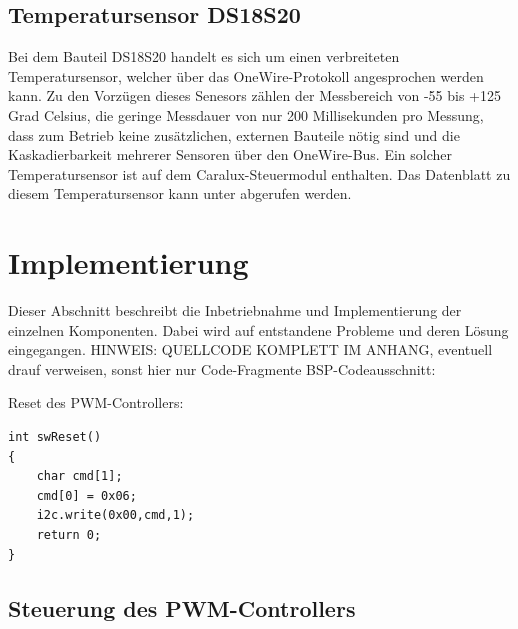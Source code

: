 \documentclass[a4paper,12pt]{scrartcl}
\begin{document}
\subsection{Temperatursensor DS18S20}
Bei dem Bauteil DS18S20 handelt es sich um einen verbreiteten Temperatursensor,
welcher über das OneWire-Protokoll angesprochen werden kann. Zu den Vorzügen
dieses Senesors zählen der Messbereich von -55 bis +125 Grad Celsius, die
geringe Messdauer von nur 200 Millisekunden pro Messung, dass zum Betrieb keine
zusätzlichen, externen Bauteile nötig sind und die Kaskadierbarkeit mehrerer
Sensoren über den OneWire-Bus. Ein solcher Temperatursensor ist auf dem
Caralux-Steuermodul enthalten. Das Datenblatt zu diesem Temperatursensor kann
unter \cite{specds1820} abgerufen werden.

\clearpage
\section{Implementierung}
Dieser Abschnitt beschreibt die Inbetriebnahme und Implementierung der einzelnen Komponenten. Dabei wird auf entstandene Probleme und deren Lösung eingegangen.
HINWEIS: QUELLCODE KOMPLETT IM ANHANG, eventuell drauf verweisen, sonst hier nur Code-Fragmente
BSP-Codeausschnitt:

Reset des PWM-Controllers:
\begin{lstlisting}[captionpos=b, caption=Code-Ausschnitt: Software-Reset des PWM-Controllers, label=codeswreset]
int swReset()
{
    char cmd[1];
    cmd[0] = 0x06;
    i2c.write(0x00,cmd,1);
    return 0;
}
\end{lstlisting}


\subsection{Steuerung des PWM-Controllers}
\end{document}
